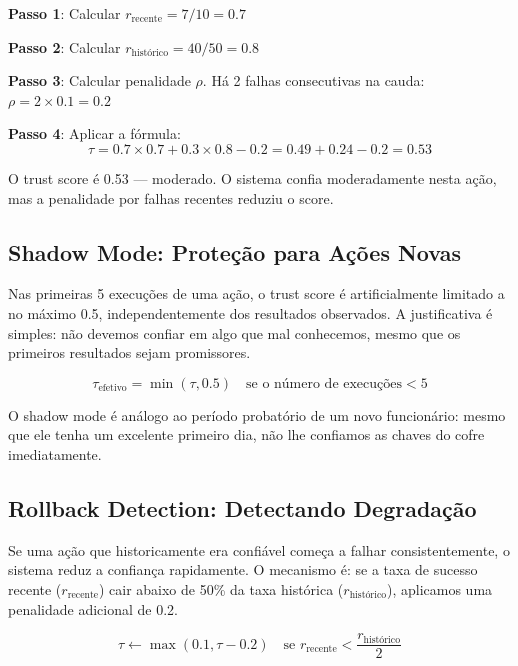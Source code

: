 \textbf{Passo 1}: Calcular $r_{\text{recente}} = 7/10 = 0.7$

\textbf{Passo 2}: Calcular $r_{\text{histórico}} = 40/50 = 0.8$

\textbf{Passo 3}: Calcular penalidade $\rho$. Há 2 falhas consecutivas na cauda: $\rho = 2 \times 0.1 = 0.2$

\textbf{Passo 4}: Aplicar a fórmula:
\begin{equation}
\tau = 0.7 \times 0.7 + 0.3 \times 0.8 - 0.2 = 0.49 + 0.24 - 0.2 = 0.53
\end{equation}

O trust score é 0.53 — moderado. O sistema confia moderadamente nesta ação, mas a penalidade por falhas recentes reduziu o score.

\subsection{Shadow Mode: Proteção para Ações Novas}

Nas primeiras 5 execuções de uma ação, o trust score é artificialmente limitado a no máximo 0.5, independentemente dos resultados observados. A justificativa é simples: não devemos confiar em algo que mal conhecemos, mesmo que os primeiros resultados sejam promissores.

\begin{equation}
\tau_{\text{efetivo}} = \min(\tau, 0.5) \quad \text{se o número de execuções} < 5
\label{eq:shadow}
\end{equation}

O shadow mode é análogo ao período probatório de um novo funcionário: mesmo que ele tenha um excelente primeiro dia, não lhe confiamos as chaves do cofre imediatamente.

\subsection{Rollback Detection: Detectando Degradação}

Se uma ação que historicamente era confiável começa a falhar consistentemente, o sistema reduz a confiança rapidamente. O mecanismo é: se a taxa de sucesso recente ($r_{\text{recente}}$) cair abaixo de 50\% da taxa histórica ($r_{\text{histórico}}$), aplicamos uma penalidade adicional de 0.2.

\begin{equation}
\tau \leftarrow \max(0.1, \tau - 0.2) \quad \text{se } r_{\text{recente}} < \frac{r_{\text{histórico}}}{2}
\label{eq:rollback}
\end{equation}

